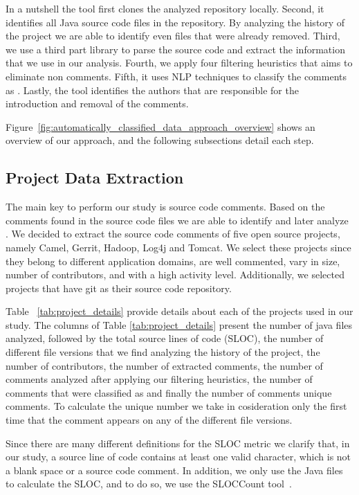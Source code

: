 In a nutshell the tool first clones the analyzed repository locally. Second, it identifies all Java source code files in the repository. By analyzing the history of the project we are able to identify even files that were already removed. Third, we use a third part library to parse the source code and extract the information that we use in our analysis. Fourth, we apply four filtering heuristics that aims to eliminate non \SATD comments. Fifth, it uses NLP techniques to classify the comments as \SATD. Lastly, the tool identifies the authors that are responsible for the introduction and removal of the \SATD comments. 

Figure~\ref{fig:automatically_classified_data_approach_overview} shows an overview of our approach, and the following subsections detail each step.

\subsection{Project Data Extraction}
\label{sub:project_data_extraction}

The main key to perform our study is source code comments. Based on the comments found in the source code files we are able to identify and later analyze \SATD. We decided to extract the source code comments of five open source projects, namely Camel, Gerrit, Hadoop, Log4j and Tomcat. We select these projects since they belong to different application domains, are well commented, vary in size, number of contributors, and with a high activity level. Additionally, we selected projects that have git as their source code repository.

Table ~\ref{tab:project_details} provide details about each of the projects used in our study. The columns of Table \ref{tab:project_details} present the number of java files analyzed, followed by the total source lines of code (SLOC), the number of different file versions that we find analyzing the history of the project, the number of contributors, the number of extracted comments, the number of comments analyzed after applying our filtering heuristics, the number of comments that were classified as \SATD and finally the number of comments unique \SATD comments. To calculate the unique \SATD number we take in cosideration only the first time that the comment appears on any of the different file versions. 

Since there are many different definitions for the SLOC metric we clarify that, in our study, a source line of code contains at least one valid character, which is not a blank space or a source code comment. In addition, we only use the Java files to calculate the SLOC, and to do so, we use the SLOCCount tool~\cite{wheeler2004:home}. 

